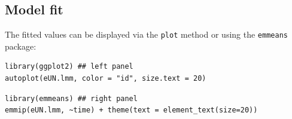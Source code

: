 \documentclass[12pt]{article}
\begin{document}
\subsection{Model fit}
\label{sec:org063aeb0}

The fitted values can be displayed via the \texttt{plot} method or using the \texttt{emmeans} package:

\lstset{language=r,label= ,caption= ,captionpos=b,numbers=none}
\begin{lstlisting}
library(ggplot2) ## left panel
autoplot(eUN.lmm, color = "id", size.text = 20)
\end{lstlisting}

\lstset{language=r,label= ,caption= ,captionpos=b,numbers=none}
\begin{lstlisting}
library(emmeans) ## right panel
emmip(eUN.lmm, ~time) + theme(text = element_text(size=20))
\end{lstlisting}
\end{document}
